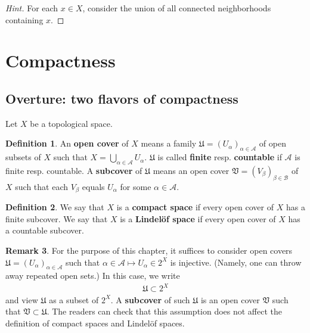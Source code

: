 \documentclass[12pt,b5paper,notitlepage]{article}
\theoremstyle{definition}
\newtheorem{df}{Definition}[section]
\newtheorem{rem}[df]{Remark}
\theoremstyle{plain}
\newcommand{\fk}{\mathfrak}
\newcommand{\scr}{\mathscr}
\numberwithin{equation}{section}
\begin{document}
\begin{proof}[Hint]
For each $x\in X$, consider the union of all connected neighborhoods containing $x$.
\end{proof}




\newpage

\section{Compactness}\label{lb351}


\subsection{Overture: two flavors of compactness}

Let $X$ be a topological space.



\begin{df}
An \textbf{open cover}  of $X$ means a family $\fk U=(U_\alpha)_{\alpha\in\scr A}$ of open subsets of $X$ such that $X=\bigcup_{\alpha\in\scr A} U_\alpha$. $\fk U$ is called \textbf{finite} resp. \textbf{countable} if $\scr A$ is finite resp. countable. A \textbf{subcover}  of $\fk U$ means an open cover $\fk V=(V_\beta)_{\beta\in\scr B}$ of $X$ such that each $V_\beta$ equals $U_\alpha$ for some $\alpha\in\scr A$.
\end{df}

\begin{df}
We say that $X$ is a \textbf{compact space}  if every open cover of $X$ has a finite subcover.  We say that $X$ is a \textbf{Lindel\"of space}  if every open cover of $X$ has a countable subcover.
\end{df}

\begin{rem}
For the purpose of this chapter, it suffices to consider open covers $\fk U=(U_\alpha)_{\alpha\in\scr A}$ such that $\alpha\in\scr A\mapsto U_\alpha\in 2^X$ is injective. (Namely, one can throw away repeated open sets.) In this case, we write
\begin{align*}
\fk U\subset 2^X
\end{align*}
and view $\fk U$ as a subset of $2^X$. A \textbf{subcover} of such $\fk U$ is an open cover $\fk V$ such that $\fk V\subset\fk U$. The readers can check that this assumption does not affect the definition of compact spaces and Lindel\"of spaces.
\end{rem}
\end{document}
